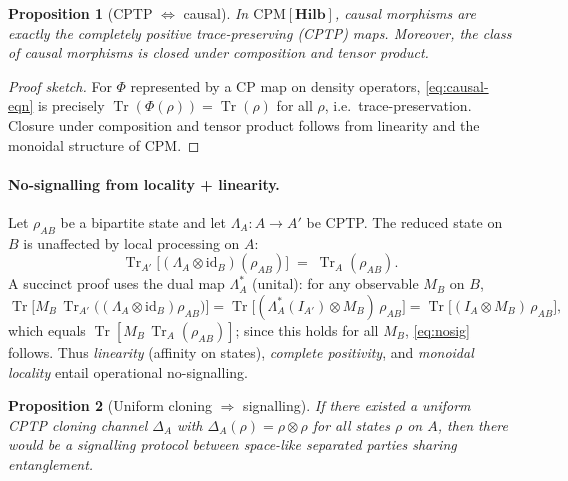 \documentclass[11pt]{article}
\theoremstyle{upright}
\newtheorem{proposition}{Proposition}
\begin{document}
\begin{proposition}[CPTP $\Leftrightarrow$ causal]
\label{prop:cptp-causal}
In $\mathrm{CPM}[\mathbf{Hilb}]$, causal morphisms are exactly the completely positive trace-preserving (CPTP) maps. Moreover, the class of causal morphisms is closed under composition and tensor product.
\end{proposition}

\begin{proof}[Proof sketch]
For $\Phi$ represented by a CP map on density operators, \eqref{eq:causal-eqn} is precisely $\operatorname{Tr}(\Phi(\rho))=\operatorname{Tr}(\rho)$ for all $\rho$, i.e.\ trace-preservation. Closure under composition and tensor product follows from linearity and the monoidal structure of CPM.
\end{proof}

\paragraph{No-signalling from locality + linearity.}
Let $\rho_{AB}$ be a bipartite state and let $\Lambda_A:A\!\to\!A'$ be CPTP. The reduced state on $B$ is unaffected by local processing on $A$:
\begin{equation}
\operatorname{Tr}_{A'}\!\big[(\Lambda_A\otimes \mathrm{id}_B)(\rho_{AB})\big]\;=\;\operatorname{Tr}_{A}(\rho_{AB}).
\label{eq:nosig}
\end{equation}
A succinct proof uses the dual map $\Lambda_A^\ast$ (unital): for any observable $M_B$ on $B$,
\[
\operatorname{Tr}\!\Big[ M_B \,\operatorname{Tr}_{A'}\!\big((\Lambda_A\!\otimes\!\mathrm{id}_B)\rho_{AB}\big)\Big]
= \operatorname{Tr}\!\big[ (\Lambda_A^\ast(I_{A'})\!\otimes\!M_B)\,\rho_{AB}\big]
= \operatorname{Tr}\!\big[ (I_A\!\otimes\!M_B)\,\rho_{AB}\big],
\]
which equals $\operatorname{Tr}[M_B\,\operatorname{Tr}_A(\rho_{AB})]$; since this holds for all $M_B$, \eqref{eq:nosig} follows. Thus \emph{linearity} (affinity on states), \emph{complete positivity}, and \emph{monoidal locality} entail operational no-signalling.

\begin{proposition}[Uniform cloning $\Rightarrow$ signalling]
\label{prop:clone-signal}
If there existed a \emph{uniform} CPTP cloning channel $\Delta_A$ with $\Delta_A(\rho)=\rho\otimes \rho$ for all states $\rho$ on $A$, then there would be a signalling protocol between space-like separated parties sharing entanglement.
\end{proposition}
\end{document}
